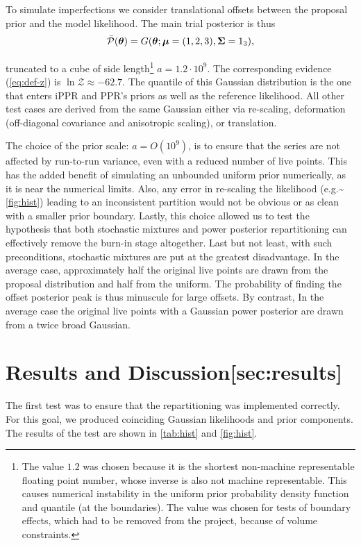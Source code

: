 \documentclass[draft,usenatbib]{mnras}
\begin{document}
To simulate imperfections we consider translational offsets between
the proposal prior and the model likelihood.  The main trial posterior
is thus
\begin{equation}
\bar{{\cal P}}(\bm{\theta}) = G(\bm{\theta}; \bm{\mu} =
(1,2,3),\bm{\Sigma} = \mathrm{1}_{3}),
\end{equation}

truncated to a cube of side length\footnote{The value \(1.2\) was
chosen because it is the shortest non-machine representable floating
point number, whose inverse is also not machine representable. This
causes numerical instability in the uniform prior probability
density function and quantile (at the boundaries). The value was
chosen for tests of boundary effects, which had to be removed from
the project, because of volume constraints.}
\(a = 1.2 \cdot 10^{9}\). The corresponding evidence (\cref{eq:def-z})
is \(\ln \mathcal{Z}\approx-62.7\). The quantile of this Gaussian
distribution is the one that enters iPPR and PPR's priors as well as
the reference likelihood. All other test cases are derived from the
same Gaussian either via re-scaling, deformation (off-diagonal
covariance and anisotropic scaling), or translation.

The choice of the prior scale: \(a = O(10^{9})\), is to ensure that
the series are not affected by run-to-run variance, even with a
reduced number of live points. This has the added benefit of
simulating an unbounded uniform prior numerically, as it is near the
numerical limits. Also, any error in re-scaling the likelihood
(e.g.\textasciitilde{}\cref{fig:hist}) leading to an inconsistent partition would not
be obvious or as clean with a smaller prior boundary. Lastly, this
choice allowed us to test the hypothesis that both stochastic mixtures
and power posterior repartitioning can effectively remove the burn-in
stage altogether. Last but not least, with such preconditions,
stochastic mixtures are put at the greatest disadvantage. In the
average case, approximately half the original live points are drawn
from the proposal distribution and half from the uniform. The
probability of finding the offset posterior peak is thus minuscule for
large offsets. By contrast, In the average case the original live
points with a Gaussian power posterior are drawn from a twice broad
Gaussian.

\section{Results and Discussion[sec:results]}
\label{sec:org9f21dda}
The first test was to ensure that the repartitioning was implemented
correctly. For this goal, we produced coinciding Gaussian likelihoods
and prior components. The results of the test are shown in
\cref{tab:hist} and \cref{fig:hist}.
\end{document}

